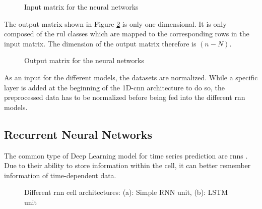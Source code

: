 \documentclass[conference]{IEEEtran}
\begin{document}
\begin{figure}[htp]
	\centering
	
	\caption{Input matrix for the neural networks}
	\label{fig:input_matrix}
\end{figure}

The output matrix shown in Figure \ref{fig:output_matrix} is only one dimensional. It is only composed of the \gls{rul} classes which are mapped to the corresponding rows in the input matrix. The dimension of the output matrix therefore is $ (n-N) $.

\begin{figure}[htp]
	\centering
	
	\caption{Output matrix for the neural networks}
	\label{fig:output_matrix}
\end{figure}

As an input for the different models, the datasets are normalized. While a specific layer is added at the beginning of the 1D-\gls{cnn} architecture to do so, the preprocessed data has to be normalized before being fed into the different \gls{rnn} models.

\subsection{Recurrent Neural Networks}
\label{sec:recurrent_neural_networks}

The common type of Deep Learning model for time series prediction are \glspl{rnn} \cite{Bai2018}. Due to their ability to store information within the cell, it can better remember information of time-dependent data. 

\begin{figure}[htp]
	\centering
	\quad
	\caption{Different \gls{rnn} cell architectures: (a): Simple RNN unit, (b): LSTM unit \cite{Chen2021}}
	\label{fig:RNN-classification}
\end{figure}
\end{document}
